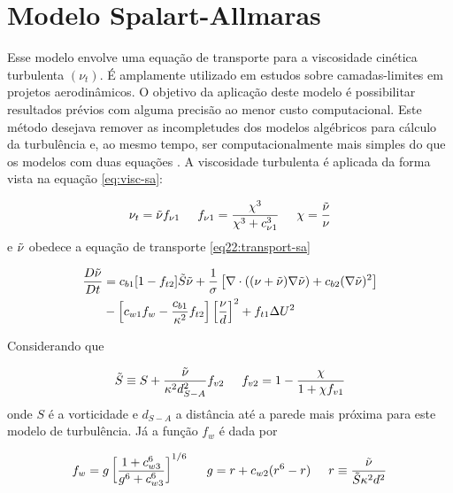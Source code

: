 \section{Modelo Spalart-Allmaras}

Esse modelo \cite{Spalart1992} envolve uma equação de transporte para a viscosidade cinética turbulenta \(\left(\nu_t\right)\). É amplamente utilizado em estudos sobre camadas-limites em projetos aerodinâmicos. O objetivo da aplicação deste modelo é possibilitar resultados prévios com alguma precisão ao menor custo computacional. Este método desejava remover as incompletudes dos modelos algébricos para cálculo da turbulência e, ao mesmo tempo, ser computacionalmente mais simples do que os modelos com duas equações \cite{pope_2000}. A viscosidade turbulenta é aplicada da forma vista na equação \ref{eq:visc-sa}:

\begin{equation}
    \label{eq:visc-sa}
    \nu_t = \Tilde{\nu} f_{\nu 1} \hspace{5mm} f_{\nu 1} = \frac{\chi^3}{\chi^3 + c^{3}_{\nu 1}} \hspace{5mm} \chi = \frac{\Tilde{\nu}}{\nu}
\end{equation}
%
e \(\Tilde{\nu}\) obedece a equação de transporte \ref{eq22:transport-sa}

\begin{equation}\label{eq22:transport-sa}
\begin{split}
    \frac{D\Tilde{\nu}}{Dt} &= c_{b1}[1 - f_{t2}]\Tilde{S}\Tilde{\nu} + \frac{1}{\sigma}\left[\nabla \cdot ((\nu + \Tilde{\nu})\nabla \Tilde{\nu}) + c_{b2}(\nabla \Tilde{\nu})^2 \right] \\&- \left[c_{w1}f_w - \frac{c_{b1}}{\kappa^2}f_{t2}\right]\left[\frac{\nu}{d}\right]^2 + f_{t1}\Delta U^2
\end{split}
\end{equation}

Considerando que

\begin{equation}
    \Tilde{S} \equiv S + \frac{\Tilde{\nu}}{\kappa^2d_{S-A}^2}f_{v2} \hspace{5mm} f_{v2} = 1 - \frac{\chi}{1 + \chi f_{v1}}
\end{equation}
%
onde \(S\) é a vorticidade e \(d_{S-A}\) a distância até a parede mais próxima para este modelo de turbulência. Já a função \(f_{w}\) é dada por

\begin{equation}
    f_w = g\left[\frac{1 + c^{6}_{w3}}{g^6 + c^{6}_{w3}} \right]^{1/6} \hspace{5mm} g = r + c_{w2}(r^6 - r) \hspace{5mm} r \equiv \frac{\Tilde{\nu}}{\Tilde{S}\kappa^2d^2}
\end{equation}

